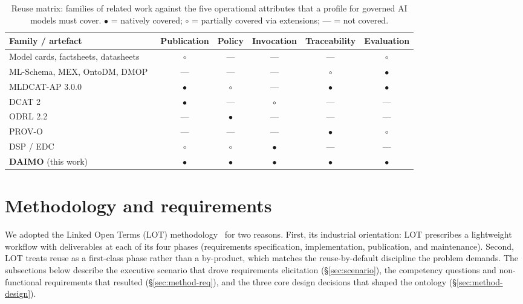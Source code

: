 \documentclass[Afour,sagev,times]{sagej}
\begin{document}
\begin{table}[t]
\small\sf\centering
\caption{Reuse matrix: families of related work against the five operational attributes that a profile for governed AI models must cover. $\bullet$ = natively covered; $\circ$ = partially covered via extensions; --- = not covered.\label{tab:reuse-matrix}}
\begin{tabular}{@{}lccccc@{}}
\toprule
\textbf{Family / artefact} & \textbf{Publication} & \textbf{Policy} & \textbf{Invocation} & \textbf{Traceability} & \textbf{Evaluation} \\
\midrule
Model cards, factsheets, datasheets~\cite{mitchell19,arnold19,gebru21} & $\circ$ & --- & --- & --- & $\circ$ \\
ML-Schema, MEX, OntoDM, DMOP~\cite{mls,mex,ontodm,dmop} & --- & --- & --- & $\circ$ & $\bullet$ \\
MLDCAT-AP 3.0.0~\cite{mldcatap} & $\bullet$ & $\circ$ & --- & $\bullet$ & $\bullet$ \\
DCAT 2~\cite{dcat2} & $\bullet$ & --- & $\circ$ & --- & --- \\
ODRL 2.2~\cite{odrl22} & --- & $\bullet$ & --- & --- & --- \\
PROV-O~\cite{provo} & --- & --- & --- & $\bullet$ & $\circ$ \\
DSP / EDC~\cite{dsp,edc} & $\circ$ & $\circ$ & $\bullet$ & --- & --- \\
\midrule
\textbf{DAIMO} (this work) & $\bullet$ & $\bullet$ & $\bullet$ & $\bullet$ & $\bullet$ \\
\bottomrule
\end{tabular}
\end{table}

\section{Methodology and requirements}\label{sec:method}

We adopted the Linked Open Terms (LOT) methodology~\cite{lot22} for two reasons. First, its industrial orientation: LOT prescribes a lightweight workflow with deliverables at each of its four phases (requirements specification, implementation, publication, and maintenance). Second, LOT treats reuse as a first-class phase rather than a by-product, which matches the reuse-by-default discipline the problem demands. The subsections below describe the executive scenario that drove requirements elicitation (§\ref{sec:scenario}), the competency questions and non-functional requirements that resulted (§\ref{sec:method-req}), and the three core design decisions that shaped the ontology (§\ref{sec:method-design}).
\end{document}
